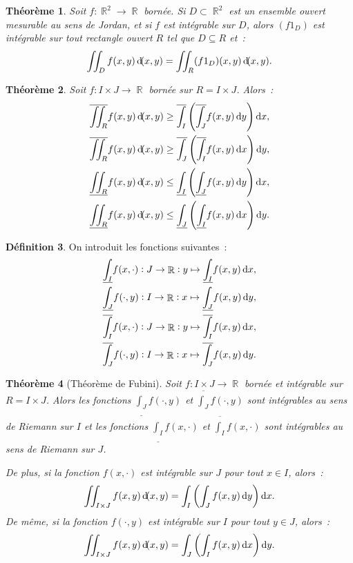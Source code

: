 \documentclass{article}
\DeclareMathOperator{\R}{\mathbb R}
\newtheorem{thm}{Théorème}[section]
\theoremstyle{definition}
\newtheorem{déf}[thm]{Définition}
\theoremstyle{remark}
\begin{document}
		\begin{thm} Soit $f : \R^2 \to \R$ bornée. Si $D \subset \R^2$ est un ensemble ouvert mesurable au sens de Jordan, et si $f$ est intégrable sur $D$,
		alors $(f1_D)$ est intégrable sur tout rectangle ouvert $R$ tel que $D \subseteq R$ et~:
		\[\iint_D f(x, y)\dif (x, y) = \iint_R (f1_D)(x, y)\dif (x, y).\]
		\end{thm}

		\begin{thm} Soit $f : I \times J \to \R$ bornée sur $R = I \times J$. Alors~:
		\begin{align*}
			\overline {\iint_R}f(x, y)\dif (x, y) &\geq \overline {\int_I}\left(\overline {\int_J} f(x, y)\dif y\right)\dif x, \\
			\overline {\iint_R}f(x, y)\dif (x, y) &\geq \overline {\int_J}\left(\overline {\int_I} f(x, y)\dif x\right)\dif y, \\
			\underline {\iint_R}f(x, y)\dif (x, y) &\leq \underline {\int_I}\left(\underline {\int_J} f(x, y)\dif y\right)\dif x, \\
			\underline {\iint_R}f(x, y)\dif (x, y) &\leq \underline {\int_J}\left(\underline {\int_I} f(x, y)\dif x\right)\dif y.
		\end{align*}
		\end{thm}

		\begin{déf} On introduit les fonctions suivantes~:
		\begin{align*}
			\underline {\int_I}f(x, \cdot) : J \to \R : y \mapsto \underline {\int_I} f(x, y)\dif x, \\
			\underline {\int_J}f(\cdot, y) : I \to \R : x \mapsto \underline {\int_J} f(x, y)\dif y, \\
			\overline  {\int_I}f(x, \cdot) : J \to \R : y \mapsto \overline  {\int_I} f(x, y)\dif x, \\
			\overline  {\int_J}f(\cdot, y) : I \to \R : x \mapsto \overline  {\int_J} f(x, y)\dif y.
		\end{align*}
		\end{déf}

		\begin{thm}[Théorème de Fubini] Soit $f : I \times J \to \R$ bornée et intégrable sur $R = I \times J$. Alors les fonctions $\underline {\int_J}f(\cdot, y)$
		et $\overline {\int_J}f(\cdot, y)$ sont intégrables au sens de Riemann sur $I$ et les fonctions $\underline {\int_I}f(x, \cdot)$ et
		$\overline {\int_I}f(x, \cdot)$ sont intégrables au sens de Riemann sur $J$.

		De plus, si la fonction $f(x, \cdot)$ est intégrable sur $J$ pour tout $x \in I$, alors~:
		\[\iint_{I \times J}f(x, y)\dif (x, y) = \int_I\left(\int_J f(x, y)\dif y\right)\dif x.\]
		De même, si la fonction $f(\cdot, y)$ est intégrable sur $I$ pour tout $y \in J$, alors~:
		\[\iint_{I \times J}f(x, y)\dif (x, y) = \int_J\left(\int_I f(x, y)\dif x\right)\dif y.\]
		\end{thm}
\end{document}
